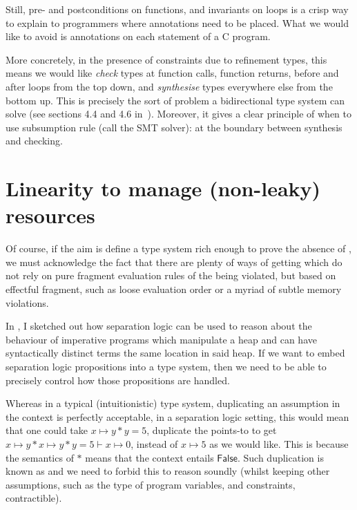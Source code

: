 Still, pre- and postconditions on functions, and invariants on loops is a crisp
way to explain to programmers where annotations need to be placed. What we
would like to avoid is annotations on each statement of a C program.

More concretely, in the presence of constraints due to refinement types, this
means we would like \emph{check} types at function calls, function returns,
before and after loops from the top down, and \emph{synthesise} types
everywhere else from the bottom up. This is precisely the sort of problem a
bidirectional type system can solve (see sections 4.4 and 4.6
in~). Moreover, it gives a clear principle of
when to use subsumption rule (call the SMT solver): at the boundary between
synthesis and checking.

\section{Linearity to manage (non-leaky) resources}

Of course, if the aim is define a type system rich enough to prove the absence
of , we must acknowledge the fact that there are plenty of ways of
getting  which do not rely on pure fragment evaluation rules of the
 being violated, but based on effectful fragment, such as loose
evaluation order or a myriad of subtle memory violations.

In , I sketched out how separation logic can be
used to reason about the behaviour of imperative programs which manipulate a
heap and can have syntactically distinct terms  the same location
in said heap. If we want to embed separation logic propositions into a type
system, then we need to be able to precisely control how those propositions are
handled.

Whereas in a typical (intuitionistic) type system, duplicating an assumption in
the context is perfectly acceptable, in a separation logic setting, this would
mean that one could take $x \mapsto{} y \ast{} y = 5$, duplicate the points-to
to get $x \mapsto{} y \ast{} x \mapsto{} y \ast y = 5 \vdash{} x \mapsto{} 0$,
instead of $x \mapsto{} 5$ as we would like. This is because the semantics of
$\ast{}$ means that the context entails $\mathsf{False}$. Such duplication is
known as  and we need to forbid this to reason soundly
(whilst keeping other assumptions, such as the type of  program
variables, and constraints, contractible).

